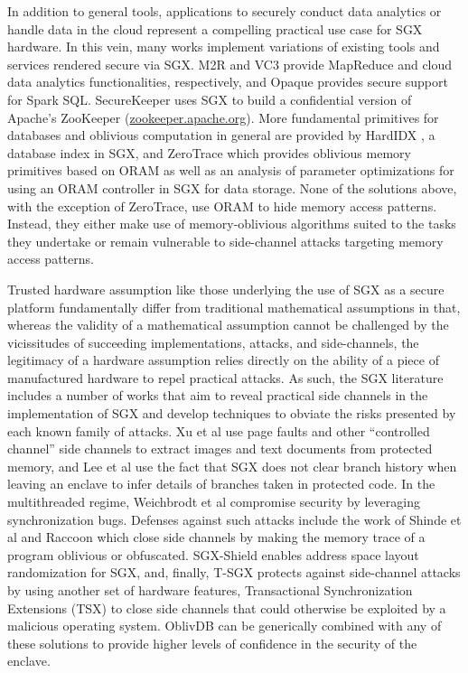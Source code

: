 \documentclass[USenglish,oneside,twocolumn]{article}
\def\name/{OblivDB}
\begin{document}
In addition to general tools, applications to securely conduct data analytics or handle data in the cloud represent a compelling practical use case for SGX hardware. In this vein, many works implement variations of existing tools and services rendered secure via SGX. M2R \cite{DSC+15} and VC3 \cite{SCF+15} provide MapReduce and cloud data analytics functionalities, respectively, and Opaque \cite{ZDB+17} provides secure support for Spark SQL. SecureKeeper \cite{BWG+16} uses SGX to build a confidential version of Apache's ZooKeeper (\url{zookeeper.apache.org}). More fundamental primitives for databases and oblivious computation in general are provided by HardIDX \cite{FBB+17}, a database index in SGX, and ZeroTrace \cite{SGF17} which provides oblivious memory primitives based on ORAM as well as an analysis of parameter optimizations for using an ORAM controller in SGX for data storage. None of the solutions above, with the exception of ZeroTrace, use ORAM to hide memory access patterns. Instead, they either make use of memory-oblivious algorithms suited to the tasks they undertake or remain vulnerable to side-channel attacks targeting memory access patterns. 

Trusted hardware assumption like those underlying the use of SGX as a secure platform fundamentally differ from traditional mathematical assumptions in that, whereas the validity of a mathematical assumption cannot be challenged by the vicissitudes of succeeding implementations, attacks, and side-channels, the legitimacy of a hardware assumption relies directly on the ability of a piece of manufactured hardware to repel practical attacks. As such, the SGX literature includes a number of works that aim to reveal practical side channels in the implementation of SGX and develop techniques to obviate the risks presented by each known family of attacks. Xu et al \cite{XCP15} use page faults and other ``controlled channel'' side channels to extract images and text documents from protected memory, and Lee et al \cite{LSG+16} use the fact that SGX does not clear branch history when leaving an enclave to infer details of branches taken in protected code. In the multithreaded regime, Weichbrodt et al \cite{WKPK16} compromise security by leveraging synchronization bugs. Defenses against such attacks include the work of Shinde et al \cite{SCNS16} and Raccoon \cite{RLT15} which close side channels by making the memory trace of a program oblivious or obfuscated. SGX-Shield \cite{SLK+17} enables address space layout randomization for SGX, and, finally, T-SGX \cite{SLKP17} protects against side-channel attacks by using another set of hardware features, Transactional Synchronization Extensions (TSX) to close side channels that could otherwise be exploited by a malicious operating system. \name/ can be generically combined with any of these solutions to provide higher levels of confidence in the security of the enclave. 
\end{document}
